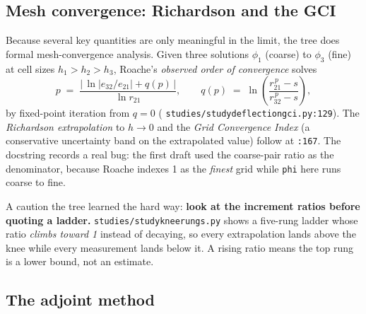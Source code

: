 \documentclass[11pt,a4paper]{article}
\DeclareRobustCommand{\code}[1]{%
  \texttt{\small\def\_{\textunderscore\discretionary{}{}{}}#1}}
\newcommand{\at}[2]{\code{#1:#2}}
\begin{document}
\subsection{Mesh convergence: Richardson and the GCI}
\label{sec:gci}

Because several key quantities are only meaningful in the limit, the tree does formal
mesh-convergence analysis. Given three solutions $\phi_1$ (coarse) to $\phi_3$ (fine)
at cell sizes $h_1 > h_2 > h_3$, Roache's \emph{observed order of convergence} solves
%
\begin{equation}
  p \;=\; \frac{\bigl|\,\ln|e_{32}/e_{21}| + q(p)\,\bigr|}{\ln r_{21}},
  \qquad
  q(p) \;=\; \ln\!\left(\frac{r_{21}^{\,p} - s}{r_{32}^{\,p} - s}\right),
  \label{eq:roache}
\end{equation}
%
by fixed-point iteration from $q = 0$ (\at{studies/study\_deflection\_gci.py}{129}). The
\emph{Richardson extrapolation} to $h \to 0$ and the \emph{Grid Convergence Index} (a
conservative uncertainty band on the extrapolated value) follow at \code{:167}. The
docstring records a real bug: the first draft used the coarse-pair ratio as the
denominator, because Roache indexes 1 as the \emph{finest} grid while \code{phi} here
runs coarse to fine.

A caution the tree learned the hard way: \textbf{look at the increment ratios before
quoting a ladder.} \code{studies/study\_knee\_rungs.py} shows a five-rung ladder whose
ratio \emph{climbs toward 1} instead of decaying, so every extrapolation lands above
the knee while every measurement lands below it. A rising ratio means the top rung is a
lower bound, not an estimate.

\subsection{The adjoint method}
\label{sec:adjoint}
\end{document}
